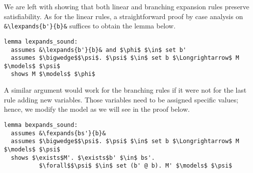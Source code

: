 \documentclass[sigplan,10pt,anonymous,review]{acmart}
\newcommand{\lefttrianglebar}{\mathrel{\tikz[baseline]{\draw (1ex, 0.75ex) -- (0, 1.25ex) -- (0, 0.25ex) -- cycle; \draw (0, 0.75ex) -- (1ex, 0.75ex);}}}
\newcommand{\lefttriangle}{\mathrel{\tikz[baseline]{\draw (1ex, 0.75ex) -- (0, 1.25ex) -- (0, 0.25ex) -- cycle;}}}
\newcommand{\lexpands}[2]{#1 $\lefttriangle$ #2}
\newcommand{\fexpands}[2]{#1 $\lefttrianglebar$ #2}
\begin{document}
\noindent We are left with showing that both linear and branching expansion rules preserve satisfiability.
As for the linear rules, a straightforward proof by case analysis on \lstinline!&\lexpands{b'}{b}&! suffices to obtain the lemma below.
\begin{lstlisting}[label={lst:lexpands_sound}]
lemma lexpands_sound:
  assumes &\lexpands{b'}{b}& and $\phi$ $\in$ set b'
  assumes $\bigwedge$$\psi$. $\psi$ $\in$ set b $\Longrightarrow$ M $\models$ $\psi$
  shows M $\models$ $\phi$
\end{lstlisting}
A similar argument would work for the branching rules if it were not for the last rule adding new variables.
Those variables need to be assigned specific values; hence, we modify the model as we will see in the proof below.
\begin{lstlisting}[belowskip=0pt, label={lst:bexpands_sound}]
lemma bexpands_sound:
  assumes &\fexpands{bs'}{b}&
  assumes $\bigwedge$$\psi$. $\psi$ $\in$ set b $\Longrightarrow$ M $\models$ $\psi$
  shows $\exists$M'. $\exists$b' $\in$ bs'.
          $\forall$$\psi$ $\in$ set (b' @ b). M' $\models$ $\psi$
\end{lstlisting}
\end{document}
